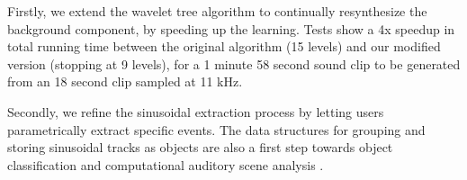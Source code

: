 \documentclass[twoside]{article}
\begin{document}
Firstly, we extend the wavelet tree algorithm to 
continually resynthesize the background component, by speeding up the 
learning. Tests show a 4x speedup 
in total running time between the original algorithm (15 levels) and our modified version (stopping 
at 9 levels), for a 1 minute 58 second sound clip to be generated from an 18 second clip sampled at 
11 kHz.



Secondly, we refine the sinusoidal extraction process by letting users 
parametrically extract specific events. 
The data structures for grouping and storing sinusoidal tracks as 
objects are also a first step towards object classification and 
computational auditory scene analysis \cite{paper:85:Bregman90}. 
\end{document}
